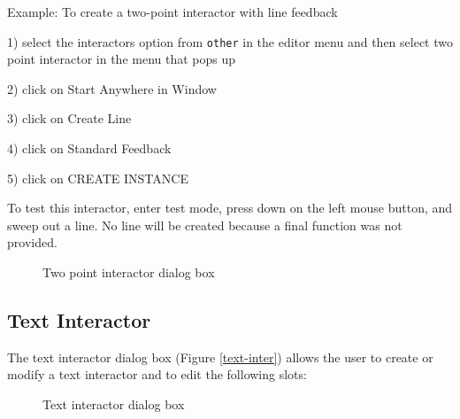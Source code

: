 Example: To create a two-point interactor with line feedback

1) select the interactors option from {\tt other} in the editor menu
and then select two point interactor in the menu that pops up

2) click on Start Anywhere in Window

3) click on Create Line

4) click on Standard Feedback

5) click on CREATE INSTANCE

To test this interactor, enter test mode, press down on the left mouse button, and sweep out a line.  No line will be created because a final function
was not provided.

\begin{figure}
\begin{center}
\end{center}
\caption{Two point interactor dialog box}
\end{figure}


\subsection{Text Interactor}

The text interactor dialog box (Figure \ref{text-inter})
allows the user to create or modify a
text interactor and to edit the following slots:

\begin{figure}
\begin{center}
\end{center}
\caption{Text interactor dialog box}
\end{figure}

